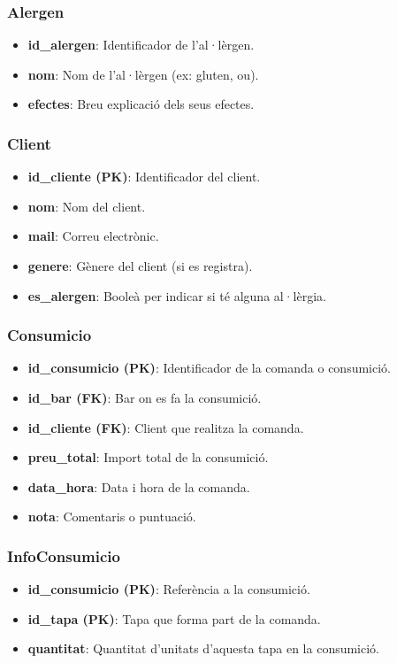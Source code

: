 \documentclass[12pt,a4paper]{article}
\begin{document}
\subsubsection*{Alergen}
\begin{itemize}
    \item \textbf{id\_alergen}: Identificador de l’al·lèrgen.
    \item \textbf{nom}: Nom de l’al·lèrgen (ex: gluten, ou).
    \item \textbf{efectes}: Breu explicació dels seus efectes.
\end{itemize}

\subsubsection*{Client}
\begin{itemize}
    \item \textbf{id\_cliente (PK)}: Identificador del client.
    \item \textbf{nom}: Nom del client.
    \item \textbf{mail}: Correu electrònic.
    \item \textbf{genere}: Gènere del client (si es registra).
    \item \textbf{es\_alergen}: Booleà per indicar si té alguna al·lèrgia.
\end{itemize}

\subsubsection*{Consumicio}
\begin{itemize}
    \item \textbf{id\_consumicio (PK)}: Identificador de la comanda o consumició.
    \item \textbf{id\_bar (FK)}: Bar on es fa la consumició.
    \item \textbf{id\_cliente (FK)}: Client que realitza la comanda.
    \item \textbf{preu\_total}: Import total de la consumició.
    \item \textbf{data\_hora}: Data i hora de la comanda.
    \item \textbf{nota}: Comentaris o puntuació.
\end{itemize}

\subsubsection*{InfoConsumicio}
\begin{itemize}
    \item \textbf{id\_consumicio (PK)}: Referència a la consumició.
    \item \textbf{id\_tapa (PK)}: Tapa que forma part de la comanda.
    \item \textbf{quantitat}: Quantitat d’unitats d’aquesta tapa en la consumició.
\end{itemize}
\end{document}
